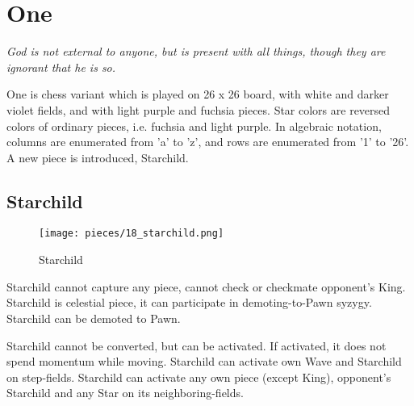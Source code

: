 

\chapter*{One}

\begin{flushright}
\parbox{0.8\textwidth}{
\emph{God is not external to anyone, but is present with all things, though
they are ignorant that he is so. \\
 } }
\end{flushright}

\noindent
One is chess variant which is played on 26 x 26 board, with white and
darker violet fields, and with light purple and fuchsia pieces. Star
colors are reversed colors of ordinary pieces, i.e. fuchsia and light
purple. In algebraic notation, columns are enumerated from 'a' to 'z',
and rows are enumerated from '1' to '26'. A new piece is introduced,
Starchild.

\clearpage %

\section*{Starchild}

\noindent
\begin{wrapfigure}[11]{l}{0.4\textwidth}
\centering
\texttt{[image: pieces/18\_starchild.png]}
\caption{Starchild}
\label{fig:18_starchild}
\end{wrapfigure}
Starchild cannot capture any piece, cannot check or checkmate opponent's King.
Starchild is celestial piece, it can participate in demoting-to-Pawn syzygy.
Starchild can be demoted to Pawn.

Starchild cannot be converted, but can be activated. If activated, it does not spend
momentum while moving. Starchild can activate own Wave and Starchild on step-fields.
Starchild can activate any own piece (except King), opponent's Starchild and any Star
on its neighboring-fields.

